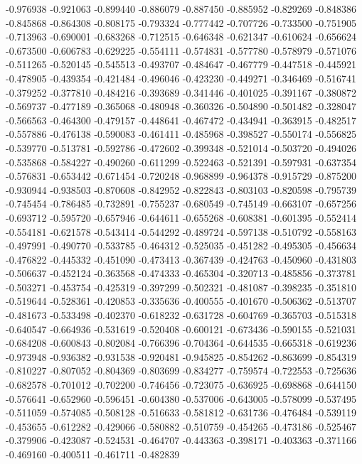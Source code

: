 -0.976938
-0.921063
-0.899440
-0.886079
-0.887450
-0.885952
-0.829269
-0.848386
-0.845868
-0.864308
-0.808175
-0.793324
-0.777442
-0.707726
-0.733500
-0.751905
-0.713963
-0.690001
-0.683268
-0.712515
-0.646348
-0.621347
-0.610624
-0.656624
-0.673500
-0.606783
-0.629225
-0.554111
-0.574831
-0.577780
-0.578979
-0.571076
-0.511265
-0.520145
-0.545513
-0.493707
-0.484647
-0.467779
-0.447518
-0.445921
-0.478905
-0.439354
-0.421484
-0.496046
-0.423230
-0.449271
-0.346469
-0.516741
-0.379252
-0.377810
-0.484216
-0.393689
-0.341446
-0.401025
-0.391167
-0.380872
-0.569737
-0.477189
-0.365068
-0.480948
-0.360326
-0.504890
-0.501482
-0.328047
-0.566563
-0.464300
-0.479157
-0.448641
-0.467472
-0.434941
-0.363915
-0.482517
-0.557886
-0.476138
-0.590083
-0.461411
-0.485968
-0.398527
-0.550174
-0.556825
-0.539770
-0.513781
-0.592786
-0.472602
-0.399348
-0.521014
-0.503720
-0.494026
-0.535868
-0.584227
-0.490260
-0.611299
-0.522463
-0.521391
-0.597931
-0.637354
-0.576831
-0.653442
-0.671454
-0.720248
-0.968899
-0.964378
-0.915729
-0.875200
-0.930944
-0.938503
-0.870608
-0.842952
-0.822843
-0.803103
-0.820598
-0.795739
-0.745454
-0.786485
-0.732891
-0.755237
-0.680549
-0.745149
-0.663107
-0.657256
-0.693712
-0.595720
-0.657946
-0.644611
-0.655268
-0.608381
-0.601395
-0.552414
-0.554181
-0.621578
-0.543414
-0.544292
-0.489724
-0.597138
-0.510792
-0.558163
-0.497991
-0.490770
-0.533785
-0.464312
-0.525035
-0.451282
-0.495305
-0.456634
-0.476822
-0.445332
-0.451090
-0.473413
-0.367439
-0.424763
-0.450960
-0.431803
-0.506637
-0.452124
-0.363568
-0.474333
-0.465304
-0.320713
-0.485856
-0.373781
-0.503271
-0.453754
-0.425319
-0.397299
-0.502321
-0.481087
-0.398235
-0.351810
-0.519644
-0.528361
-0.420853
-0.335636
-0.400555
-0.401670
-0.506362
-0.513707
-0.481673
-0.533498
-0.402370
-0.618232
-0.631728
-0.604769
-0.365703
-0.515318
-0.640547
-0.664936
-0.531619
-0.520408
-0.600121
-0.673436
-0.590155
-0.521031
-0.684208
-0.600843
-0.802084
-0.766396
-0.704364
-0.644535
-0.665318
-0.619236
-0.973948
-0.936382
-0.931538
-0.920481
-0.945825
-0.854262
-0.863699
-0.854319
-0.810227
-0.807052
-0.804369
-0.803699
-0.834277
-0.759574
-0.722553
-0.725636
-0.682578
-0.701012
-0.702200
-0.746456
-0.723075
-0.636925
-0.698868
-0.644150
-0.576641
-0.652960
-0.596451
-0.604380
-0.537006
-0.643005
-0.578099
-0.537495
-0.511059
-0.574085
-0.508128
-0.516633
-0.581812
-0.631736
-0.476484
-0.539119
-0.453655
-0.612282
-0.429066
-0.580882
-0.510759
-0.454265
-0.473186
-0.525467
-0.379906
-0.423087
-0.524531
-0.464707
-0.443363
-0.398171
-0.403363
-0.371166
-0.469160
-0.400511
-0.461711
-0.482839
